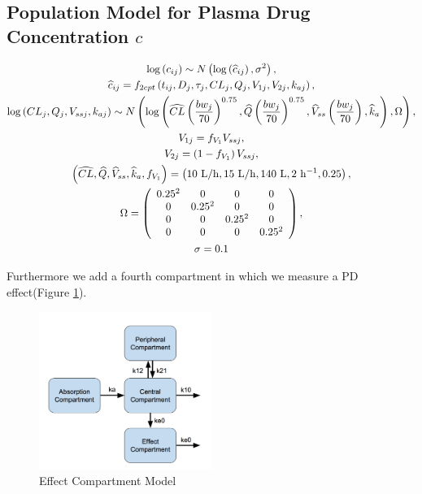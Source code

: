 \documentclass[10pt, reqno, oneside]{amsbook}
\numberwithin{equation}{chapter}
\numberwithin{figure}{chapter}
\numberwithin{table}{chapter}
\theoremstyle{remark}
\begin{document}
\subsection{Population Model for Plasma Drug Concentration \(c\)}
\label{sec:org878c79d}
\begin{gather*}
  \log\left(c_{ij}\right) \sim N\left(\log\left(\widehat{c}_{ij}\right),\sigma^2\right), \\
  \widehat{c}_{ij} = f_{2cpt}\left(t_{ij},D_j,\tau_j,CL_j,Q_j,V_{1j},V_{2j},k_{aj}\right), \\
  \log\left(CL_j,Q_j,V_{ssj},k_{aj}\right) \sim N\left(\log\left(\widehat{CL}\left(\frac{bw_j}{70}\right)^{0.75},\widehat{Q}\left(\frac{bw_j}{70}\right)^{0.75}, \widehat{V}_{ss}\left(\frac{bw_j}{70}\right),\widehat{k}_a\right),\Omega\right), \\
  V_{1j} = f_{V_1}V_{ssj}, \\
  V_{2j} = \left(1 - f_{V_1}\right)V_{ssj}, \\
  \left(\widehat{CL},\widehat{Q},\widehat{V}_{ss},\widehat{k}_a, f_{V_1}\right) = \left(10\ {\rm L/h},15\  {\rm L/h},140\  {\rm L},2\ {\rm h^{-1}}, 0.25 \right), \\
  \Omega = \left(\begin{array}{cccc} 0.25^2 & 0 & 0 & 0 \\ 0 & 0.25^2 & 0 & 0 \\
                    0 & 0 & 0.25^2 & 0 \\ 0 & 0 & 0 & 0.25^2  \end{array}\right), \\
  \sigma = 0.1
\end{gather*}

Furthermore we add a fourth compartment in which we measure
a PD effect(Figure \ref{eff_model}).

\begin{figure}[htbp]
\centering
\includegraphics[width=0.5\textwidth]{./graphics/effCptModel.png}
\caption{\label{eff_model}
Effect Compartment Model}
\end{figure}
\end{document}

